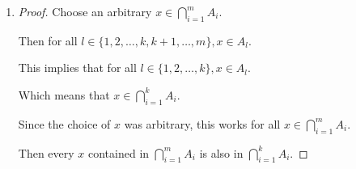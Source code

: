 \documentclass[12pt,letterpaper]{article}
\begin{document}
\begin{enumerate}
\begin{enumerate}
\begin{enumerate}
\begin{proof}
                Since the choice of $x$ was arbitrary, this works for all $x \in \bigcup\limits_{i = 1}^k A_i$.

                Then every $x$ contained in $\bigcup\limits_{i = 1}^k A_i$ is also in $\bigcup\limits_{i = 1}^m A_i$.

                Thus $\bigcup\limits_{i = 1}^k A_i \subseteq \bigcup\limits_{i = 1}^m A_i$
              \end{proof}
            \item
              \begin{proof}
                Choose an arbitrary $x \in \bigcap\limits_{i = 1}^m A_i$.

                Then for all $l \in \{1, 2, \dots, k, k + 1, \dots, m\}, x \in A_l$.

                This implies that for all $l \in \{1, 2, \dots, k\}, x \in A_l$.

                Which means that $x \in \bigcap\limits_{i = 1}^k A_i$.

                Since the choice of $x$ was arbitrary, this works for all $x \in \bigcap\limits_{i = 1}^m A_i$.

                Then every $x$ contained in $\bigcap\limits_{i = 1}^m A_i$ is also in $\bigcap\limits_{i = 1}^k A_i$.


\end{proof}
\end{enumerate}
\end{enumerate}
\end{enumerate}
\end{document}
